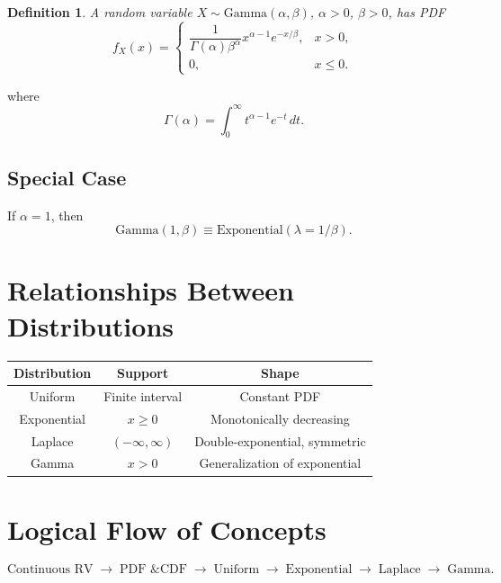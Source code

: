 \documentclass[11pt]{article}
\newtheorem{definition}{Definition}
\begin{document}
\begin{definition}
A random variable $X \sim \text{Gamma}(\alpha,\beta)$, $\alpha>0$, $\beta>0$, has PDF
\[
f_X(x) =
\begin{cases}
\dfrac{1}{\Gamma(\alpha)\beta^\alpha} x^{\alpha-1} e^{-x/\beta}, & x>0,\\
0, & x \le 0.
\end{cases}
\]
\end{definition}

where
\[
\Gamma(\alpha) = \int_{0}^{\infty} t^{\alpha-1} e^{-t}\, dt.
\]

\subsection*{Special Case}

If $\alpha = 1$, then
\[
\text{Gamma}(1,\beta) \equiv \text{Exponential}(\lambda = 1/\beta).
\]

\section{Relationships Between Distributions}

\begin{center}
\begin{tabular}{|c|c|c|}
\hline
Distribution & Support & Shape \\
\hline
Uniform & Finite interval & Constant PDF \\
Exponential & $x \ge 0$ & Monotonically decreasing \\
Laplace & $(-\infty,\infty)$ & Double-exponential, symmetric \\
Gamma & $x>0$ & Generalization of exponential \\
\hline
\end{tabular}
\end{center}

\section{Logical Flow of Concepts}

\[
\text{Continuous RV}
\;\rightarrow\;
\text{PDF \& CDF}
\;\rightarrow\;
\text{Uniform}
\;\rightarrow\;
\text{Exponential}
\;\rightarrow\;
\text{Laplace}
\;\rightarrow\;
\text{Gamma}.
\]
\end{document}
